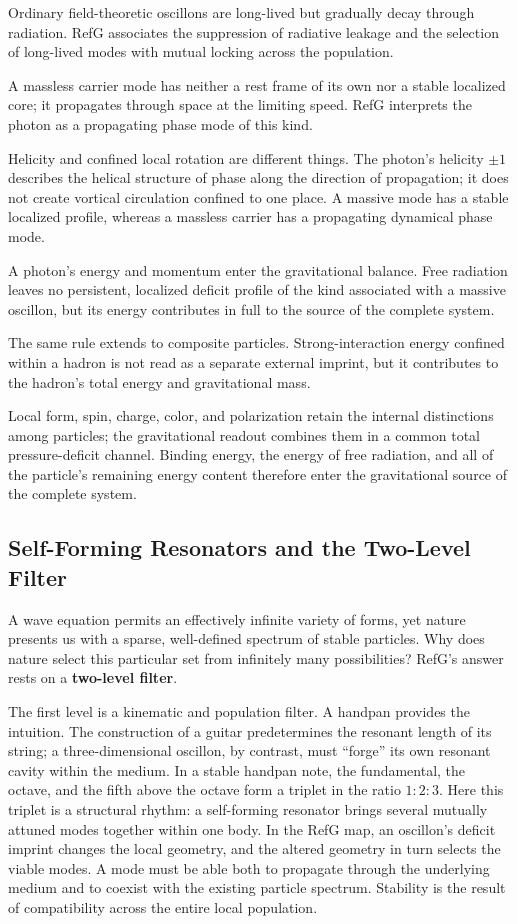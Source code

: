 \documentclass[11pt,a4paper]{article}
\begin{document}
Ordinary field-theoretic oscillons are long-lived but gradually decay through radiation. RefG associates the suppression of radiative leakage and the selection of long-lived modes with mutual locking across the population.

A massless carrier mode has neither a rest frame of its own nor a stable localized core; it propagates through space at the limiting speed. RefG interprets the photon as a propagating phase mode of this kind.

Helicity and confined local rotation are different things. The photon's helicity $\pm1$ describes the helical structure of phase along the direction of propagation; it does not create vortical circulation confined to one place. A massive mode has a stable localized profile, whereas a massless carrier has a propagating dynamical phase mode.

A photon's energy and momentum enter the gravitational balance. Free radiation leaves no persistent, localized deficit profile of the kind associated with a massive oscillon, but its energy contributes in full to the source of the complete system.

The same rule extends to composite particles. Strong-interaction energy confined within a hadron is not read as a separate external imprint, but it contributes to the hadron's total energy and gravitational mass.

Local form, spin, charge, color, and polarization retain the internal distinctions among particles; the gravitational readout combines them in a common total pressure-deficit channel. Binding energy, the energy of free radiation, and all of the particle's remaining energy content therefore enter the gravitational source of the complete system.

\subsection{Self-Forming Resonators and the Two-Level Filter}

A wave equation permits an effectively infinite variety of forms, yet nature presents us with a sparse, well-defined spectrum of stable particles. Why does nature select this particular set from infinitely many possibilities? RefG's answer rests on a \textbf{two-level filter}.

The first level is a kinematic and population filter. A handpan provides the intuition. The construction of a guitar predetermines the resonant length of its string; a three-dimensional oscillon, by contrast, must ``forge'' its own resonant cavity within the medium. In a stable handpan note, the fundamental, the octave, and the fifth above the octave form a triplet in the ratio $1:2:3$. Here this triplet is a structural rhythm: a self-forming resonator brings several mutually attuned modes together within one body. In the RefG map, an oscillon's deficit imprint changes the local geometry, and the altered geometry in turn selects the viable modes. A mode must be able both to propagate through the underlying medium and to coexist with the existing particle spectrum. Stability is the result of compatibility across the entire local population.
\end{document}
